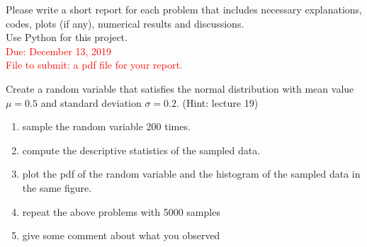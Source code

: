 \documentclass[11pt]{article}
\begin{document}

Please write a short report for each problem that includes necessary  explanations, codes, plots (if any),  numerical results and discussions.\\
Use  Python  for this project.\\
\textcolor{red}{Due: December 13, 2019\\
File to submit: a pdf file for your report.
}

 Create a random variable that satisfies the normal distribution with mean value $\mu=0.5$ and standard deviation $\sigma=0.2$. (Hint: lecture 19)
\begin{enumerate}
\item sample the random variable 200 times.
\item compute the descriptive statistics of the sampled data.
\item plot the pdf of the random variable  and the histogram of the sampled data in the same figure.
\item repeat the above problems with 5000 samples
\item give some comment about what you observed
\end{enumerate}
\end{document}
